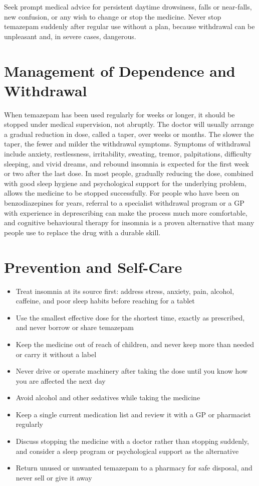 Seek prompt medical advice for persistent daytime drowsiness, falls or near-falls, new confusion, or any wish to change or stop the medicine. Never stop temazepam suddenly after regular use without a plan, because withdrawal can be unpleasant and, in severe cases, dangerous.

\section*{Management of Dependence and Withdrawal}
When temazepam has been used regularly for weeks or longer, it should be stopped under medical supervision, not abruptly. The doctor will usually arrange a gradual reduction in dose, called a taper, over weeks or months. The slower the taper, the fewer and milder the withdrawal symptoms. Symptoms of withdrawal include anxiety, restlessness, irritability, sweating, tremor, palpitations, difficulty sleeping, and vivid dreams, and rebound insomnia is expected for the first week or two after the last dose. In most people, gradually reducing the dose, combined with good sleep hygiene and psychological support for the underlying problem, allows the medicine to be stopped successfully. For people who have been on benzodiazepines for years, referral to a specialist withdrawal program or a GP with experience in deprescribing can make the process much more comfortable, and cognitive behavioural therapy for insomnia is a proven alternative that many people use to replace the drug with a durable skill.

\section*{Prevention and Self-Care}
\begin{itemize}
    \item Treat insomnia at its source first: address stress, anxiety, pain, alcohol, caffeine, and poor sleep habits before reaching for a tablet
    \item Use the smallest effective dose for the shortest time, exactly as prescribed, and never borrow or share temazepam
    \item Keep the medicine out of reach of children, and never keep more than needed or carry it without a label
    \item Never drive or operate machinery after taking the dose until you know how you are affected the next day
    \item Avoid alcohol and other sedatives while taking the medicine
    \item Keep a single current medication list and review it with a GP or pharmacist regularly
    \item Discuss stopping the medicine with a doctor rather than stopping suddenly, and consider a sleep program or psychological support as the alternative
    \item Return unused or unwanted temazepam to a pharmacy for safe disposal, and never sell or give it away
\end{itemize}

